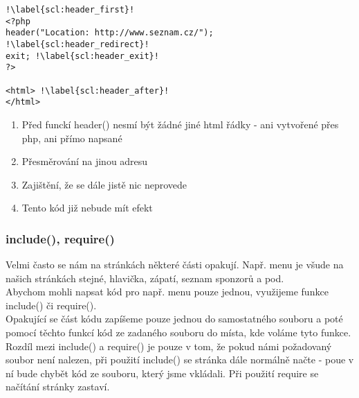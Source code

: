 \begin{minipage}[t]{.45\textwidth}
\begin{code}
\begin{verbatim}
!\label{scl:header_first}!
<?php
header("Location: http://www.seznam.cz/"); !\label{scl:header_redirect}!
exit; !\label{scl:header_exit}!
?>

<html> !\label{scl:header_after}!
</html> 
\end{verbatim}

\label{code:php_header}
\end{code}
\end{minipage}
\begin{minipage}[t]{.45\textwidth}
\begin{enumerate}
\item[ř. \ref{scl:header_first}:] Před funckí header() nesmí být žádné jiné html řádky - ani vytvořené přes php, ani přímo napsané
\item[ř. \ref{scl:header_redirect}:] Přesměrování na jinou adresu
\item[ř. \ref{scl:header_exit}:] Zajištění, že se dále jistě nic neprovede
\item[ř. \ref{scl:header_after}:] Tento kód již nebude mít efekt
\end{enumerate}
\end{minipage}

\subsubsection{include(), require()}
Velmi často se nám na stránkách některé části opakují. Např. menu je všude na našich stránkách stejné, hlavička, zápatí, seznam sponzorů a pod.\\
Abychom mohli napsat kód pro např. menu pouze jednou, využijeme funkce include() či require().\\
Opakující se část kódu zapíšeme pouze jednou do samostatného souboru a poté pomocí těchto funkcí  kód ze zadaného souboru do místa, kde voláme tyto funkce.\\
Rozdíl mezi include() a require() je pouze v tom, že pokud námi požadovaný soubor není nalezen, při použití include() se stránka dále normálně načte - poue v ní bude chybět kód ze souboru, který jsme vkládali. Při použití require se načítání stránky zastaví. 

